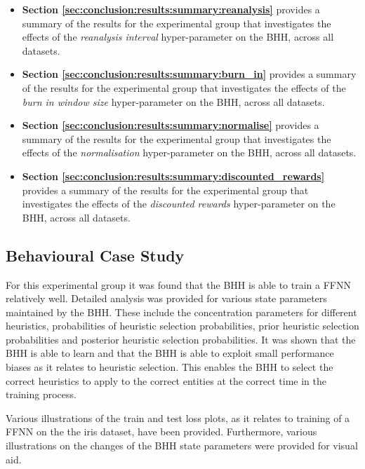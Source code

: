 \begin{itemize}
      \item \textbf{Section \ref{sec:conclusion:results:summary:reanalysis}} provides a summary of the results for the experimental group that investigates the effects of the \textit{reanalysis interval} hyper-parameter on the \acs{BHH}, across all datasets.

      \item \textbf{Section \ref{sec:conclusion:results:summary:burn_in}} provides a summary of the results for the experimental group that investigates the effects of the \textit{burn in window size} hyper-parameter on the \acs{BHH}, across all datasets.

      \item \textbf{Section \ref{sec:conclusion:results:summary:normalise}} provides a summary of the results for the experimental group that investigates the effects of the \textit{normalisation} hyper-parameter on the \acs{BHH}, across all datasets.

      \item \textbf{Section \ref{sec:conclusion:results:summary:discounted_rewards}} provides a summary of the results for the experimental group that investigates the effects of the \textit{discounted rewards} hyper-parameter on the \acs{BHH}, across all datasets.
\end{itemize}

\subsection{Behavioural Case Study}
\label{sec:conclusion:results:summary:case_study}

For this experimental group it was found that the \ac{BHH} is able to train a \acf{FFNN} relatively well. Detailed analysis was provided for various state parameters maintained by the \acs{BHH}. These include the concentration parameters for different heuristics, probabilities of heuristic selection probabilities, prior heuristic selection probabilities and posterior heuristic selection probabilities. It was shown that the \ac{BHH} is able to learn and that the \acs{BHH} is able to exploit small performance biases as it relates to heuristic selection. This enables the \acs{BHH} to select the correct heuristics to apply to the correct entities at the correct time in the training process.

Various illustrations of the train and test loss plots, as it relates to training of a \acs{FFNN} on the the iris dataset, have been provided. Furthermore, various illustrations on the changes of the \acs{BHH} state parameters were provided for visual aid.

